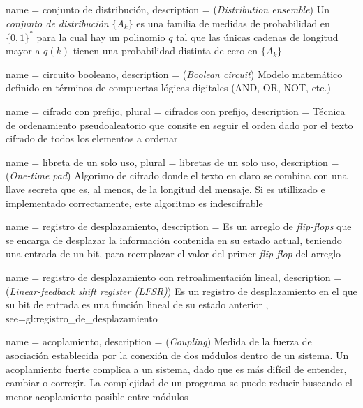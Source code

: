 {
  name = conjunto de distribución,
  description = {
    (\textit{Distribution ensemble}) Un \textit{conjunto de distribución}
    $ \{ A_k \} $ es una familia de medidas de probabilidad en $ \{0, 1\}^* $
    para la cual hay un polinomio $ q $ tal que las únicas cadenas de longitud
    mayor a $ q(k) $ tienen una probabilidad distinta de cero en
    $ \{ A_k \} $~\cite{DBLP:conf/stoc/BeaverMR90}%
  }
}

{
  name = circuito booleano,
  description = {
    (\textit{Boolean circuit}) Modelo matemático definido en términos de
    compuertas lógicas digitales (AND, OR, NOT, etc.)%
  }
}

{
  name = cifrado con prefijo,
  plural = cifrados con prefijo,
  description = {
    Técnica de ordenamiento pseudoaleatorio que consite en seguir el orden dado
    por el texto cifrado de todos los elementos a ordenar%
  }
}

{
  name = libreta de un solo uso,
  plural = libretas de un solo uso,
  description = {
    (\textit{One-time pad}) Algorimo de cifrado donde el texto en claro se combina
    con una llave secreta que es, al menos, de la longitud del mensaje. Si es
    utillizado e implementado correctamente, este algoritmo es indescifrable%
  }
}

{
  name = registro de desplazamiento,
  description = {
    Es un arreglo de \textit{flip-flops} que se encarga de desplazar la
    información contenida en su estado actual, teniendo una entrada de un
    bit, para reemplazar el valor del primer \textit{flip-flop} del arreglo%
  }
}

{
  name = registro de desplazamiento con retroalimentación lineal,
  description = {
    (\textit{Linear-feedback shift register (LFSR)}) Es un registro de
    desplazamiento en el que su bit de entrada es una función lineal de su
    estado anterior%
  },
  see={gl:registro_de_desplazamiento}
}

{
  name = acoplamiento,
  description = {
    (\textit{Coupling}) Medida de la fuerza de asociación establecida por
    la conexión de dos módulos dentro de un sistema. Un acoplamiento
    fuerte complica a un sistema, dado que es más difícil de entender,
    cambiar o corregir. La complejidad de un programa se puede reducir
    buscando el menor acoplamiento posible entre módulos
    \cite{DBLP:books/daglib/0019905}%
  }
}

